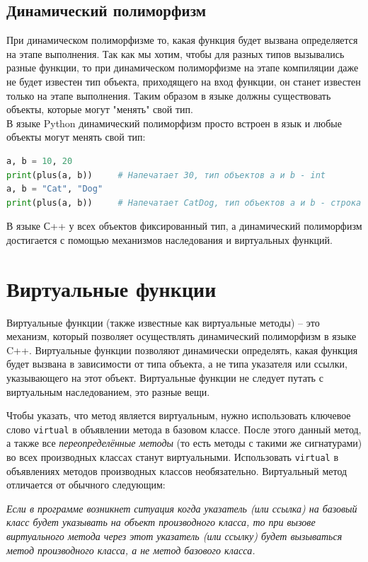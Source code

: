 \documentclass{article}
\begin{document}
\subsection*{Динамический полиморфизм}
При динамическом полиморфизме то, какая функция будет вызвана определяется на этапе выполнения. Так как мы хотим, чтобы для разных типов вызывались разные функции, то при динамическом полиморфизме на этапе компиляции даже не будет известен тип объекта, приходящего на вход функции, он станет известен только на этапе выполнения. Таким образом в языке должны существовать объекты, которые могут "менять"{} свой тип.\\
В языке Python динамический полиморфизм просто встроен в язык и любые объекты могут менять свой тип:
\begin{lstlisting}[language=Python]
a, b = 10, 20
print(plus(a, b))     # Напечатает 30, тип объектов a и b - int
a, b = "Cat", "Dog"
print(plus(a, b))     # Напечатает CatDog, тип объектов a и b - строка
\end{lstlisting}
В языке С++ у всех объектов фиксированный тип, а динамический полиморфизм достигается с помощью механизмов наследования и виртуальных функций.

\newpage
\section{Виртуальные функции}
Виртуальные функции (также известные как виртуальные методы) -- это механизм, который позволяет осуществлять динамический полиморфизм в языке C++.
Виртуальные функции позволяют динамически определять, какая функция будет вызвана в зависимости от типа объекта, а не типа указателя или ссылки, указывающего на этот объект.
Виртуальные функции не следует путать с виртуальным наследованием, это разные вещи.

Чтобы указать, что метод является виртуальным, нужно использовать ключевое слово \texttt{virtual} в объявлении метода в базовом классе. После этого данный метод, а также все \textit{переопределённые методы} (то есть методы с такими же сигнатурами) во всех производных классах станут виртуальными. Использовать \texttt{virtual} в объявлениях методов производных классов необязательно. Виртуальный метод отличается от обычного следующим:

\begin{center}
\textit{Если в программе возникнет ситуация когда указатель (или ссылка) на базовый класс будет указывать на объект производного класса, то при вызове виртуального метода через этот указатель (или ссылку) будет вызываться метод производного класса, а не метод базового класса.}
\end{center}
\end{document}

